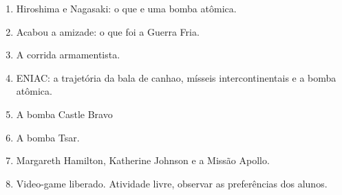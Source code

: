 \begin{enumerate}
	\item Hiroshima e Nagasaki: o que e uma bomba atômica.
	\item Acabou a amizade: o que foi a Guerra Fria.
	\item A corrida armamentista.
	\item ENIAC: a trajetória da bala de canhao, mísseis intercontinentais e a bomba atômica.
	\item A bomba Castle Bravo
	\item A bomba Tsar.
	\item Margareth Hamilton, Katherine Johnson e a Missão Apollo.
	\item Video-game liberado. Atividade livre, observar as preferências dos alunos.
\end{enumerate}
